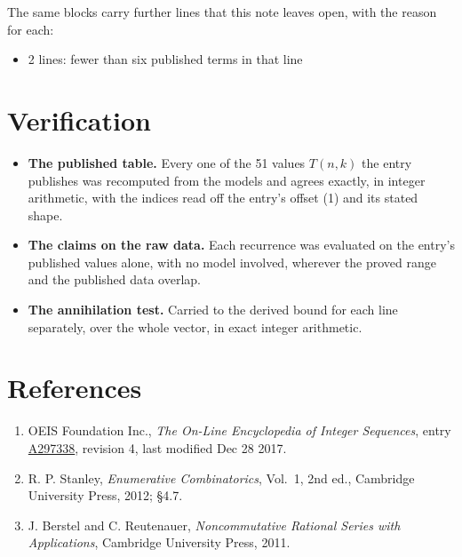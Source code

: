 \documentclass[11pt]{article}
\theoremstyle{definition}
\begin{document}
The same blocks carry further lines that this note leaves open, with the reason for each:

\begin{itemize}

\item 2 lines: fewer than six published terms in that line

\end{itemize}

\section{Verification}

\begin{itemize}

\item {\bfseries The published table.} Every one of the 51 values $T(n,k)$ the entry publishes was recomputed from the models and agrees exactly, in integer arithmetic, with the indices read off the entry's offset (1) and its stated shape.

\item {\bfseries The claims on the raw data.} Each recurrence was evaluated on the entry's published values alone, with no model involved, wherever the proved range and the published data overlap.

\item {\bfseries The annihilation test.} Carried to the derived bound for each line separately, over the whole vector, in exact integer arithmetic.

\end{itemize}

\section{References}

\begin{enumerate}

\item OEIS Foundation Inc., \emph{The On-Line Encyclopedia of Integer Sequences}, entry \href{https://oeis.org/A297338}{A297338}, revision 4, last modified Dec 28 2017.

\item R. P. Stanley, \emph{Enumerative Combinatorics}, Vol.~1, 2nd ed., Cambridge University Press, 2012; \S4.7.

\item J. Berstel and C. Reutenauer, \emph{Noncommutative Rational Series with Applications}, Cambridge University Press, 2011.

\end{enumerate}
\end{document}
